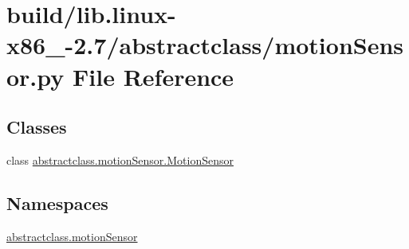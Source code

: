 \hypertarget{build_2lib_8linux-x86__64-2_87_2abstractclass_2motionSensor_8py}{}\section{build/lib.linux-\/x86\+\_-\/2.7/abstractclass/motion\+Sensor.py File Reference}
\label{build_2lib_8linux-x86__64-2_87_2abstractclass_2motionSensor_8py}
\subsection*{Classes}
\begin{DoxyCompactItemize}
\item 
class \hyperlink{classabstractclass_1_1motionSensor_1_1MotionSensor}{abstractclass.\+motion\+Sensor.\+Motion\+Sensor}
\end{DoxyCompactItemize}
\subsection*{Namespaces}
\begin{DoxyCompactItemize}
\item 
 \hyperlink{namespaceabstractclass_1_1motionSensor}{abstractclass.\+motion\+Sensor}
\end{DoxyCompactItemize}
